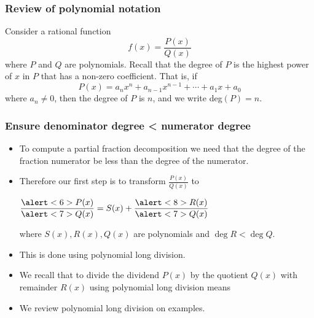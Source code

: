 \begin{frame}
\frametitle{Review of polynomial notation}
Consider a rational function
\[
f(x) = \frac{P(x)}{Q(x)}
\]
where $P$ and $Q$ are polynomials.  Recall that the degree of $P$ is the highest power of $x$ in $P$ that has a non-zero coefficient.  That is, if
\[
P(x) = a_nx^n + a_{n-1}x^{n-1} + \cdots + a_1x + a_0
\]
where $a_n \neq 0$, then the degree of $P$ is $n$, and we write deg$(P) = n$.

\end{frame}
\begin{frame}\frametitle{Ensure denominator degree < numerator degree}
\begin{itemize}
\item To compute a partial fraction decomposition we need that the degree of the fraction numerator be less than the degree of the numerator.
\item<2-> Therefore our first step is to transform $\frac{P(x)}{Q(x)}$ to

$\displaystyle \frac{\alert<6>{P(x)}}{\alert<7>{Q(x)} }= S(x)+\frac{\alert<8>{R(x)}}{\alert<7>{Q(x)}} $

where $S(x), R(x), Q(x)$ are polynomials and $\deg R<\deg Q$.
\item<3-> This is done using polynomial long division.
\item<4-> We recall that to divide the \alert<6>{dividend $P(x)$} by the \alert<7>{quotient $Q(x)$} with \alert<8>{remainder $R(x)$} using polynomial long division means 
\item<9-> We review polynomial long division on examples.
\end{itemize}



\end{frame}

